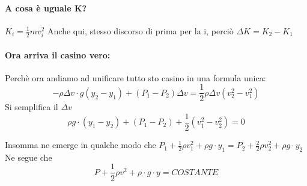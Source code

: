\documentclass[12pt, a4paper, openany, oneside]{book}
\begin{document}
\paragraph{A cosa è uguale K? } $K_{i} = \frac{1}{2}mv_{i}^{2}$
Anche qui, stesso discorso di prima per la i, perciò $\Delta K = K_{2} - K_{1}$
\paragraph{Ora arriva il casino vero: } Perchè ora andiamo ad unificare tutto 
sto casino in una formula unica:
\[
-\rho \Delta v\cdot g(y_{2} - y_{1}) + (P_{1} - P_{2})\Delta v  = 
\frac{1}{2}\rho \Delta v (v_{2}^{2} - v_{1}^{2})	
\] 
Si semplifica il $\Delta v$
\[
\rho g \cdot (y_1 - y_2) + (P_{1} - P_{2}) + \frac{1}{2}(v_{1}^{2} - 
v_{2}^{2}) = 0
\]	

Insomma ne emerge in qualche modo che 
$P_{1} + \frac{1}{2} \rho v_{1}^{2} + \rho g \cdot y_{1} = P_{2} + \frac{2}{2} \rho
v_{2}^{2} + \rho g \cdot y_{2}$
Ne segue che
\[
P + \frac{1}{2} \rho v^{2} + \rho \cdot g \cdot y = COSTANTE
\]	
\end{document}
